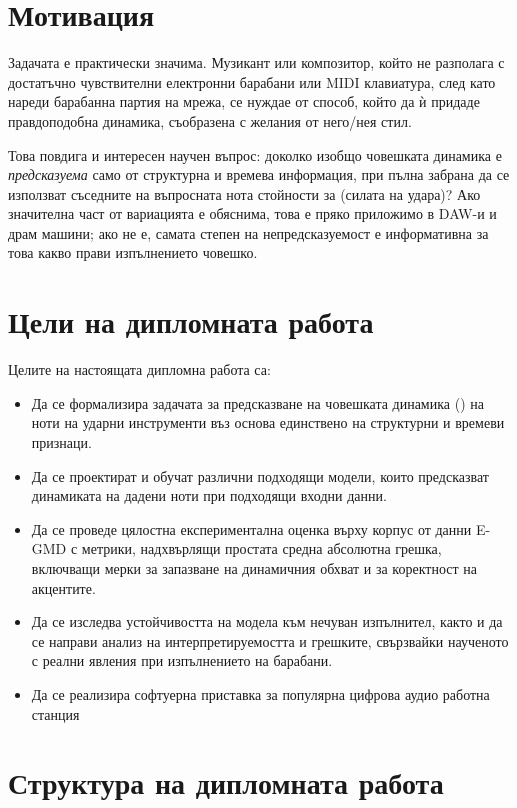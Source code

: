 \section{Мотивация}
\label{sec:motivacia}

Задачата е практически значима. Музикант или композитор, който не разполага 
с достатъчно чувствителни електронни барабани или MIDI клавиатура, след като нареди 
барабанна партия на мрежа, се нуждае от способ, който да ѝ придаде правдоподобна динамика,
съобразена с желания от него/нея стил.

Това повдига и интересен научен въпрос: доколко изобщо човешката динамика е
\emph{предсказуема} само от структурна и времева информация, при пълна забрана да се
използват съседните на въпросната нота стойности за  (силата на удара)? Ако значителна част от вариацията
е обяснима, това е пряко приложимо в DAW-и и драм машини; ако не е, самата
степен на непредсказуемост е информативна за това какво прави изпълнението
човешко.

\section{Цели на дипломната работа}
\label{sec:celi}

Целите на настоящата дипломна работа са:
\begin{itemize}
  \item Да се формализира задачата за предсказване на човешката динамика
        () на ноти на ударни инструменти въз основа единствено на структурни и
        времеви признаци.
  \item Да се проектират и обучат различни подходящи модели, които
        предсказват динамиката на дадени ноти при подходящи входни данни.
  \item Да се проведе цялостна експериментална оценка върху корпус от данни
        E-GMD с метрики, надхвърлящи простата средна абсолютна грешка, включващи
        мерки за запазване на динамичния обхват и за коректност на акцентите.
  \item Да се изследва устойчивостта на модела към нечуван изпълнител, както и
        да се направи анализ на интерпретируемостта и грешките, свързвайки
        наученото с реални явления при изпълнението на барабани.
  \item Да се реализира софтуерна приставка за популярна цифрова аудио работна станция
\end{itemize}

\section{Структура на дипломната работа}
\label{sec:struktura}

